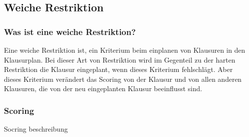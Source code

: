\subsection{Weiche Restriktion}\label{sec:Weiche Restriktion}

\subsubsection{Was ist eine weiche Restriktion?}
Eine weiche Restriktion ist, ein Kriterium beim einplanen von Klausuren in den Klausurplan.
Bei dieser Art von Restriktion wird im Gegenteil zu der harten Restriktion die Klausur eingeplant,
wenn dieses Kriterium fehlschlägt.
Aber dieses Kriterium verändert das Scoring von der Klausur und von allen anderen Klausuren, die von
der neu eingeplanten Klausur beeinflusst sind.

\subsubsection{Scoring}
Socring beschreibung




